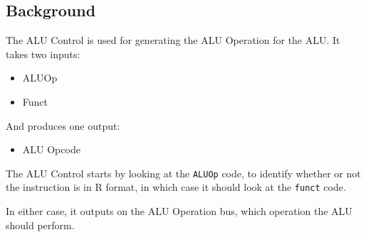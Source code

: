 \documentclass{beamer}
\begin{document}
\subsection{Background}
\begin{frame}
    The ALU Control is used for generating the ALU Operation for the ALU. It
    takes two inputs:
    \begin{itemize}
        \item ALUOp
        \item Funct
    \end{itemize}
    And produces one output:
    \begin{itemize}
        \item ALU Opcode
    \end{itemize}
\end{frame}
\begin{frame}
    \begin{figure}
    \end{figure}
\end{frame}
\begin{frame}
    The ALU Control starts by looking at the \texttt{ALUOp} code, to identify
    whether or not the instruction is in R format, in which case it should look
    at the \texttt{funct} code.

    \vspace{\baselineskip}
    In either case, it outputs on the ALU Operation bus, which operation the
    ALU should perform.
\end{frame}
\end{document}
